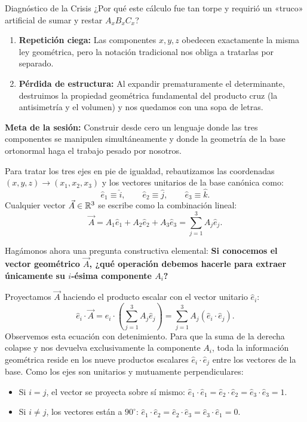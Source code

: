 \documentclass[11pt,letterpaper]{article}
\begin{document}
\begin{intuitionbox}{Diagnóstico de la Crisis}
¿Por qué este cálculo fue tan torpe y requirió un «truco» artificial de sumar y restar $A_x B_x C_x$?
\begin{enumerate}
    \item \textbf{Repetición ciega:} Las componentes $x, y, z$ obedecen exactamente la misma ley geométrica, pero la notación tradicional nos obliga a tratarlas por separado.
    \item \textbf{Pérdida de estructura:} Al expandir prematuramente el determinante, destruimos la propiedad geométrica fundamental del producto cruz (la antisimetría y el volumen) y nos quedamos con una sopa de letras.
\end{enumerate}
\textbf{Meta de la sesión:} Construir desde cero un lenguaje donde las tres componentes se manipulen simultáneamente y donde la geometría de la base ortonormal haga el trabajo pesado por nosotros.
\end{intuitionbox}


Para tratar los tres ejes en pie de igualdad, rebautizamos las coordenadas $(x, y, z) \to (x_1, x_2, x_3)$ y los vectores unitarios de la base canónica como:
\[
\hat{e}_1 \equiv \hat{i}, \qquad \hat{e}_2 \equiv \hat{j}, \qquad \hat{e}_3 \equiv \hat{k}.
\]
Cualquier vector $\vec{A} \in \mathbb{R}^3$ se escribe como la combinación lineal:
\[
\vec{A} = A_1 \hat{e}_1 + A_2 \hat{e}_2 + A_3 \hat{e}_3 = \sum_{j=1}^3 A_j \hat{e}_j.
\]

Hagámonos ahora una pregunta constructiva elemental: \textbf{Si conocemos el vector geométrico $\vec{A}$, ¿qué operación debemos hacerle para extraer únicamente su $i$-ésima componente $A_i$?}

Proyectamos $\vec{A}$ haciendo el producto escalar con el vector unitario $\hat{e}_i$:
\[
\hat{e}_i \cdot \vec{A} = \hat{e}_i \cdot \left(\sum_{j=1}^3 A_j \hat{e}_j\right) = \sum_{j=1}^3 A_j (\hat{e}_i \cdot \hat{e}_j).
\]
Observemos esta ecuación con detenimiento. Para que la suma de la derecha colapse y nos devuelva exclusivamente la componente $A_i$, toda la información geométrica reside en los nueve productos escalares $\hat{e}_i \cdot \hat{e}_j$ entre los vectores de la base. Como los ejes son unitarios y mutuamente perpendiculares:
\begin{itemize}
    \item Si $i = j$, el vector se proyecta sobre sí mismo: $\hat{e}_1\cdot\hat{e}_1 = \hat{e}_2\cdot\hat{e}_2 = \hat{e}_3\cdot\hat{e}_3 = 1$.
    \item Si $i \neq j$, los vectores están a $90^\circ$: $\hat{e}_1\cdot\hat{e}_2 = \hat{e}_2\cdot\hat{e}_3 = \hat{e}_3\cdot\hat{e}_1 = 0$.
\end{itemize}
\end{document}
